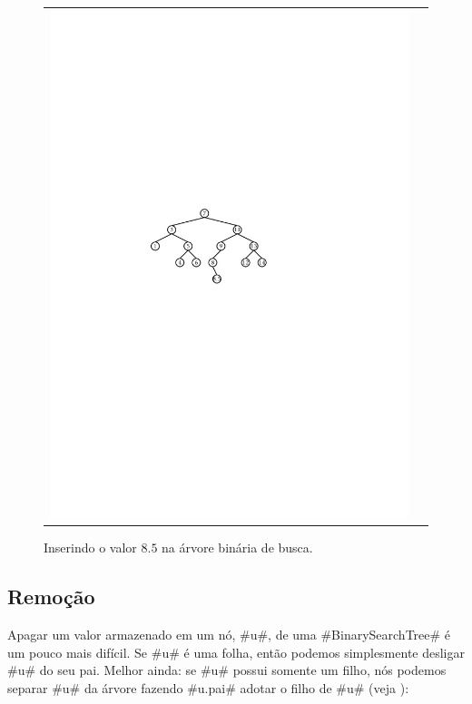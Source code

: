 \begin{figure}
\begin{center}
\begin{tabular}{cc}
    \includegraphics[width=\HalfScaleIfNeeded]{figs/bst-example-5} 
    \end{tabular}
  \end{center}
  \caption{Inserindo o valor $8.5$ na árvore binária de busca.}
\end{figure}


\subsection{Remoção}

Apagar um valor armazenado em um nó, #u#, de uma #BinarySearchTree# é um pouco mais difícil.  Se #u# é uma folha, então podemos simplesmente desligar #u# do seu pai.  Melhor ainda: se #u# possui somente um filho, nós podemos separar #u# da árvore fazendo #u.pai# adotar o filho de #u# (veja
):

